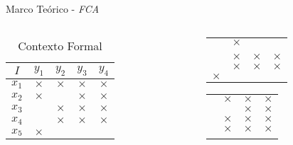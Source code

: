 \begin{frame}[c]{Marco Teórico - \emph{FCA}}
	\begin{columns}[onlytextwidth]
		\begin{column}{0.5\textwidth}
			\begin{table}[h!]
				\centering
				\begin{tabular}{|c|cccc|}
					\hline
					$I$		& $y_1$		& $y_2$ 	& $y_3$ 	& $y_4$ 	\\ \hline
					$x_1$	& $\times$	& $\times$	& $\times$ 	& $\times$ 	\\
					$x_2$	& $\times$	& 			& $\times$ 	& $\times$ 	\\
					$x_3$	& 			& $\times$	& $\times$ 	& $\times$ 	\\
					$x_4$	& 			& $\times$	& $\times$ 	& $\times$ 	\\
					$x_5$	& $\times$	& 			& 		 	& 		 	\\
					\hline
				\end{tabular}
				\label{tbl:cross_table}
				\caption{Contexto Formal}
			\end{table}
		\end{column}
		\vrule{}
		\begin{column}{0.5\textwidth}
			\begin{table}[h!]
				\centering
				\begin{tabular}{|cccc|}
					\hline
					\highlightbf{$\times$}  & $\times$      & \highlightbf{$\times$}  & \highlightbf{$\times$}  \\
					\highlightbf{$\times$}  &               & \highlightbf{$\times$}  & \highlightbf{$\times$}  \\
											& $\times$      & $\times$                & $\times$                \\
											& $\times$      & $\times$                & $\times$                \\
					$\times$                &               &                         &                         \\
			        \hline
			    \end{tabular}
			    \begin{tabular}{|cccc|}
			    	\hline
			    	\highlightbf{$\times$}  & $\times$  & $\times$  & $\times$  \\
			    	\highlightbf{$\times$}  &           & $\times$  & $\times$  \\
											& $\times$  & $\times$  & $\times$  \\
											& $\times$  & $\times$  & $\times$  \\
					\highlightbf{$\times$}  &           &           &           \\
					\hline
				\end{tabular}
			\end{table}
		\end{column}
	\end{columns}
\end{frame}